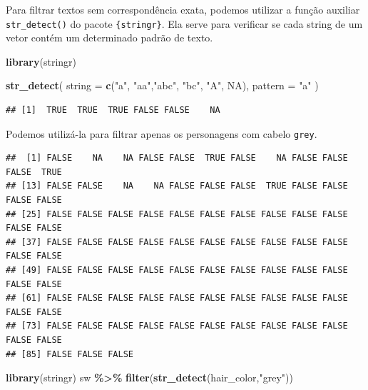 \documentclass[
]{book}
\newenvironment{Shaded}{\begin{snugshade}}{\end{snugshade}}
\newcommand{\AttributeTok}[1]{\textcolor[rgb]{0.13,0.29,0.53}{#1}}
\newcommand{\CommentTok}[1]{\textcolor[rgb]{0.56,0.35,0.01}{\textit{#1}}}
\newcommand{\ConstantTok}[1]{\textcolor[rgb]{0.56,0.35,0.01}{#1}}
\newcommand{\FunctionTok}[1]{\textcolor[rgb]{0.13,0.29,0.53}{\textbf{#1}}}
\newcommand{\NormalTok}[1]{#1}
\newcommand{\SpecialCharTok}[1]{\textcolor[rgb]{0.81,0.36,0.00}{\textbf{#1}}}
\newcommand{\StringTok}[1]{\textcolor[rgb]{0.31,0.60,0.02}{#1}}
\begin{document}
Para filtrar textos sem correspondência exata, podemos utilizar a função
auxiliar \texttt{str\_detect()} do pacote \texttt{\{stringr\}}. Ela serve para verificar
se cada string de um vetor contém um determinado padrão de texto.

\begin{Shaded}
\begin{Highlighting}[]
\FunctionTok{library}\NormalTok{(stringr)}

\FunctionTok{str\_detect}\NormalTok{(}
  \AttributeTok{string =} \FunctionTok{c}\NormalTok{(}\StringTok{"a"}\NormalTok{, }\StringTok{"aa"}\NormalTok{,}\StringTok{"abc"}\NormalTok{, }\StringTok{"bc"}\NormalTok{, }\StringTok{"A"}\NormalTok{, }\ConstantTok{NA}\NormalTok{), }
  \AttributeTok{pattern =} \StringTok{"a"}
\NormalTok{)}
\end{Highlighting}
\end{Shaded}

\begin{verbatim}
## [1]  TRUE  TRUE  TRUE FALSE FALSE    NA
\end{verbatim}

Podemos utilizá-la para filtrar apenas os personagens com cabelo \texttt{grey}.

\begin{Shaded}
\end{Shaded}

\begin{verbatim}
##  [1] FALSE    NA    NA FALSE FALSE  TRUE FALSE    NA FALSE FALSE FALSE  TRUE
## [13] FALSE FALSE    NA    NA FALSE FALSE FALSE  TRUE FALSE FALSE FALSE FALSE
## [25] FALSE FALSE FALSE FALSE FALSE FALSE FALSE FALSE FALSE FALSE FALSE FALSE
## [37] FALSE FALSE FALSE FALSE FALSE FALSE FALSE FALSE FALSE FALSE FALSE FALSE
## [49] FALSE FALSE FALSE FALSE FALSE FALSE FALSE FALSE FALSE FALSE FALSE FALSE
## [61] FALSE FALSE FALSE FALSE FALSE FALSE FALSE FALSE FALSE FALSE FALSE FALSE
## [73] FALSE FALSE FALSE FALSE FALSE FALSE FALSE FALSE FALSE FALSE FALSE FALSE
## [85] FALSE FALSE FALSE
\end{verbatim}

\begin{Shaded}
\begin{Highlighting}[]
\FunctionTok{library}\NormalTok{(stringr)}
\NormalTok{sw }\SpecialCharTok{\%\textgreater{}\%} \FunctionTok{filter}\NormalTok{(}\FunctionTok{str\_detect}\NormalTok{(hair\_color,}\StringTok{"grey"}\NormalTok{))}
\end{Highlighting}
\end{Shaded}
\end{document}
